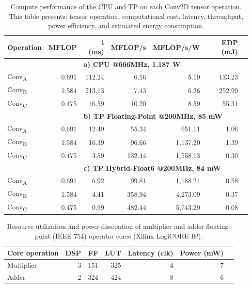 \begin{table}[!htp]\centering
	\caption{Compute performance of the CPU and TP on each Conv2D tensor operation. This table presents: tensor operation, computational cost, latency, throughput, power efficiency, and estimated energy consumption.}\label{tab:performance}
	\scriptsize
	\begin{tabular}{lrrrrrr}\toprule
		\textbf{Operation} &\textbf{MFLOP} &\textbf{t (ms)} &\textbf{MFLOP/s} &\textbf{MFLOP/s/W} &\textbf{EDP (mJ)} \\\midrule
		& &\multicolumn{4}{l}{\textbf{a) CPU @666MHz, 1.187 W}} \\
		Conv\textsubscript{A} &0.691 &112.24 &6.16 &5.19 &133.23 \\
		Conv\textsubscript{B} &1.584 &213.13 &7.43 &6.26 &252.99 \\
		Conv\textsubscript{C} &0.475 &46.59 &10.20 &8.59 &55.31 \\
		& &\multicolumn{4}{l}{\textbf{b) TP Floating-Point @200MHz, 85 mW}} \\
		Conv\textsubscript{A} &0.691 &12.49 &55.34 &651.11 &1.06 \\
		Conv\textsubscript{B} &1.584 &16.39 &96.66 &1,137.20 &1.39 \\
		Conv\textsubscript{C} &0.475 &3.59 &132.44 &1,558.13 &0.30 \\
		& &\multicolumn{4}{l}{\textbf{c) TP Hybrid-Float6 @200MHz, 84 mW}} \\
		Conv\textsubscript{A} &0.691 &6.92 &99.81 &1,188.24 &0.58 \\
		Conv\textsubscript{B} &1.584 &4.41 &358.94 &4,273.09 &0.37 \\
		Conv\textsubscript{C} &0.475 &0.99 &482.44 &5,743.29 &0.08 \\
		\bottomrule
	\end{tabular}
\end{table}


\begin{table}[!h]\centering
	\caption{Resource utilization and power dissipation of multiplier and adder floating-point (IEEE 754) operator cores (Xilinx LogiCORE IP).}\label{tab:LogiCORE}
	\scriptsize
	\begin{tabular}{lrrrrrr}\toprule
		\textbf{Core operation} &\textbf{DSP} &\textbf{FF} &\textbf{LUT} &\textbf{Latency (clk)} &\textbf{Power (mW)} \\\midrule
		Multiplier &3 &151 &325 &4 &7 \\
		Adder &2 &324 &424 &8 &6 \\
		\bottomrule
	\end{tabular}
\end{table}



